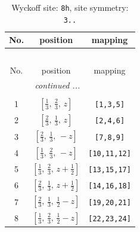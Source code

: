 \documentclass[fleqn,8pt]{jsarticle}
\begin{document}
\begin{longtable}{ccc}
\caption{Wyckoff site: {\tt 8h}, site symmetry: {\tt 3..}}
 \\
 \hline \hline
No. & position & mapping \\ \hline \endfirsthead

\multicolumn{2}{l}{\tablename\ \thetable{}} \\
 \hline \hline
No. & position & mapping \\ \hline \endhead

 \hline \hline
\multicolumn{2}{r}{\footnotesize\it continued ...} \\ \endfoot

 \hline \hline
\multicolumn{2}{r}{} \\ \endlastfoot

1 & $\left[ \frac{1}{3},\, \frac{2}{3},\, z \right]$ & {\tt [1,3,5]} \\ \hline
2 & $\left[ \frac{2}{3},\, \frac{1}{3},\, z \right]$ & {\tt [2,4,6]} \\ \hline
3 & $\left[ \frac{2}{3},\, \frac{1}{3},\, - z \right]$ & {\tt [7,8,9]} \\ \hline
4 & $\left[ \frac{1}{3},\, \frac{2}{3},\, - z \right]$ & {\tt [10,11,12]} \\ \hline
5 & $\left[ \frac{1}{3},\, \frac{2}{3},\, z + \frac{1}{2} \right]$ & {\tt [13,15,17]} \\ \hline
6 & $\left[ \frac{2}{3},\, \frac{1}{3},\, z + \frac{1}{2} \right]$ & {\tt [14,16,18]} \\ \hline
7 & $\left[ \frac{2}{3},\, \frac{1}{3},\, \frac{1}{2} - z \right]$ & {\tt [19,20,21]} \\ \hline
8 & $\left[ \frac{1}{3},\, \frac{2}{3},\, \frac{1}{2} - z \right]$ & {\tt [22,23,24]} \\
\end{longtable}
\renewcommand{\arraystretch}{1.2}
\end{document}
